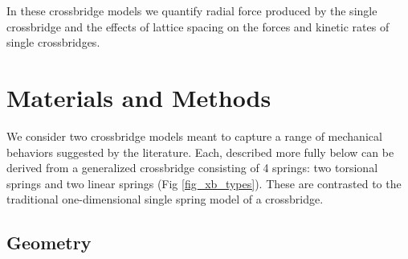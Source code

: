 \documentclass[]{article}
\begin{document}
In these crossbridge models we quantify radial force produced by the single crossbridge and the effects of lattice spacing on the forces and kinetic rates of single crossbridges.





\section{Materials and Methods}  %


We consider two crossbridge models meant to capture a range of mechanical behaviors suggested by the literature.  
Each, described more fully below can be derived from a generalized crossbridge consisting of 4 springs:  two torsional springs and two linear springs (Fig \ref{fig_xb_types}).  
These are contrasted to the traditional one-dimensional single spring model of a crossbridge.

\subsection*{Geometry} %
\end{document}
